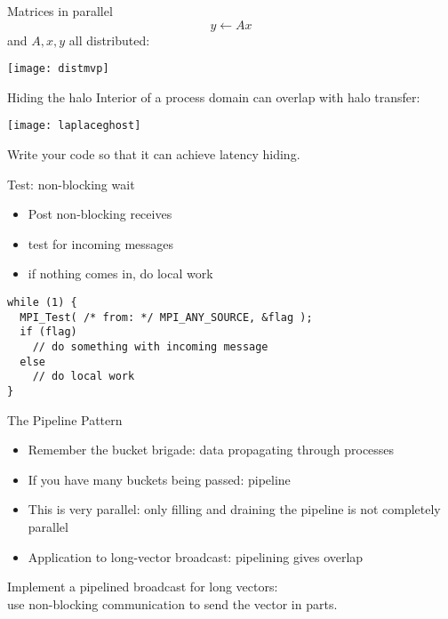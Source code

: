 \begin{numberedframe}{Matrices in parallel}
  \[ y\leftarrow Ax\]
  and $A,x,y$ all distributed:

  \texttt{[image: distmvp]}
\end{numberedframe}

\begin{numberedframe}{Hiding the halo}
  Interior of a process domain can overlap with halo transfer:

  \texttt{[image: laplaceghost]}
\end{numberedframe}

\begin{exerciseframe}[isendirecvarray]
  

  Write your code so that it can achieve latency hiding.
\end{exerciseframe}

\begin{numberedframe}{Test: non-blocking wait}
  \begin{itemize}
  \item Post non-blocking receives
  \item test for incoming messages
  \item if nothing comes in, do local work
  \end{itemize}
\lstset{language=C}
\begin{lstlisting}
while (1) {
  MPI_Test( /* from: */ MPI_ANY_SOURCE, &flag );
  if (flag)
    // do something with incoming message
  else
    // do local work
}
\end{lstlisting}
\end{numberedframe}

\begin{numberedframe}{The Pipeline Pattern}
  \begin{itemize}
  \item Remember the bucket brigade: data propagating through
    processes
  \item If you have many buckets being passed: pipeline
  \item This is very parallel: only filling and draining the pipeline
    is not completely parallel
  \item Application to long-vector broadcast: pipelining gives overlap
  \end{itemize}
\end{numberedframe}

\begin{optexerciseframe}[bucketpipenonblock]
  Implement a pipelined broadcast for long vectors:\\
  use non-blocking communication to send the vector in parts.
\end{optexerciseframe}

